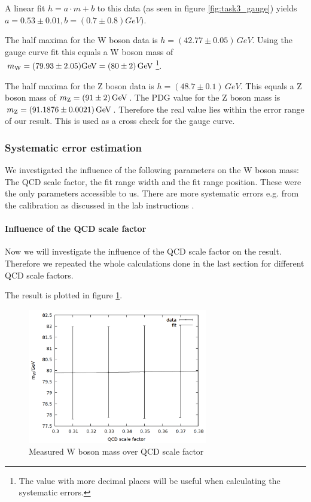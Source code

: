 A linear fit $h = a\cdot m + b$ to this data (as seen in figure \ref{fig:task3_gauge}) yields $a = 0.53\pm 0.01, b = (0.7 \pm 0.8) \si{GeV})$.

The half maxima for the W boson data is $h = (42.77\pm 0.05)\,\si{GeV}$. Using the gauge curve fit this equals a W boson mass of $m\ind{W} = (79.93 \pm 2.05) \si{GeV} = (80 \pm 2)\,\si{GeV}$\footnote{The value with more decimal places will be useful when calculating the systematic errors.}.

The half maxima for the Z boson data is $h = (48.7 \pm 0.1)\,\si{GeV}$. This equals a Z boson mass of $m\ind{Z} = (91 \pm 2) \,\si{GeV}$. The PDG value for the Z boson mass is $m\ind{Z} = (91.1876 \pm 0.0021)\,\si{GeV}$. Therefore the real value lies within the error range of our result. This is used as a cross check for the gauge curve.

\subsubsection{Systematic error estimation}

We investigated the influence of the following parameters on the W boson mass: The QCD scale factor, the fit range width and the fit range position. These were the only parameters accessible to us. There are more systematic errors e.g. from the calibration as discussed in the lab instructions \cite{lab_instructions}.

\paragraph{Influence of the QCD scale factor}

Now we will investigate the influence of the QCD scale factor on the result. Therefore we repeated the whole calculations done in the last section for different QCD scale factors.

The result is plotted in figure \ref{fig:task3_qcd}.

\begin{figure}
\centering
\includegraphics[width=0.7\textwidth]{data/qcdfactor.png}
\caption{Measured W boson mass over QCD scale factor}
\label{fig:task3_qcd}
\end{figure}

